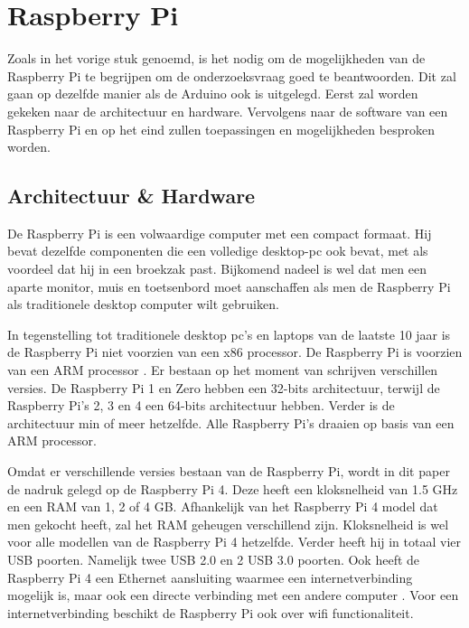 \documentclass[a4paper, dutch, abstract=true]{scrartcl}
\begin{document}
\section{Raspberry Pi}
Zoals in het vorige stuk genoemd, is het nodig om de mogelijkheden van de Raspberry Pi te
begrijpen om de onderzoeksvraag goed te beantwoorden.
Dit zal gaan op dezelfde manier als de Arduino ook is uitgelegd.
Eerst zal worden gekeken naar de architectuur en hardware.
Vervolgens naar de software van een Raspberry Pi en op het eind zullen toepassingen en mogelijkheden
besproken worden.

\subsection{Architectuur \& Hardware}
De Raspberry Pi is een volwaardige computer met een compact formaat.
Hij bevat dezelfde componenten die een volledige desktop-pc ook bevat, met als voordeel dat hij in
een broekzak past.
Bijkomend nadeel is wel dat men een aparte monitor, muis en toetsenbord moet aanschaffen als men de
Raspberry Pi als traditionele desktop computer wilt gebruiken.

In tegenstelling tot traditionele desktop pc's en laptops van de laatste 10 jaar is de Raspberry Pi
niet voorzien van een x86 processor.
De Raspberry Pi is voorzien van een ARM processor \cite{jain2014raspberry}.
Er bestaan op het moment van schrijven verschillen versies.
De Raspberry Pi 1 en Zero hebben een 32-bits architectuur, terwijl de Raspberry Pi's 2, 3 en 4 een
64-bits architectuur hebben.
Verder is de architectuur min of meer hetzelfde.
Alle Raspberry Pi's draaien op basis van een ARM processor.

Omdat er verschillende versies bestaan van de Raspberry Pi, wordt in dit paper de nadruk gelegd op
de Raspberry Pi 4.
Deze heeft een kloksnelheid van 1.5 GHz en een RAM van 1, 2 of 4 GB.
Afhankelijk van het Raspberry Pi 4 model dat men gekocht heeft, zal het RAM geheugen verschillend
zijn.
Kloksnelheid is wel voor alle modellen van de Raspberry Pi 4 hetzelfde.
Verder heeft hij in totaal vier USB poorten.
Namelijk twee USB 2.0 en 2 USB 3.0 poorten.
Ook heeft de Raspberry Pi 4 een Ethernet aansluiting waarmee een internetverbinding mogelijk is,
maar ook een directe verbinding met een andere computer \cite{maksimovic2014raspberry}.
Voor een internetverbinding beschikt de Raspberry Pi ook over wifi functionaliteit.
\end{document}
